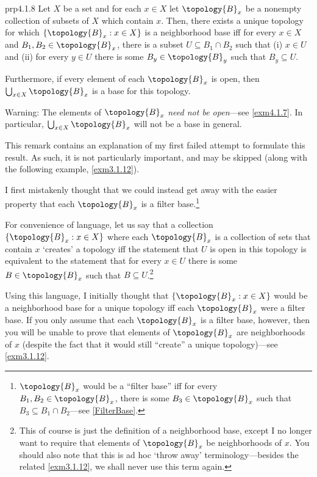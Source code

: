 \begin{prp}{}{prp4.1.8}
Let $X$ be a set and for each $x\in X$ let $\topology{B}_x$ be a nonempty collection of subsets of $X$ which contain $x$.  Then, there exists a unique topology for which $\{ \topology{B}_x:x\in X\}$ is a neighborhood base iff for every $x\in X$ and $B_1,B_2\in \topology{B}_x$, there is a subset $U\subseteq B_1\cap B_2$ such that (i) $x\in U$ and (ii) for every $y\in U$ there is some $B_y\in \topology{B}_y$ such that $B_y\subseteq U$.
	
Furthermore, if every element of each $\topology{B}_x$ is open, then $\bigcup _{x\in X}\topology{B}_x$ is a base for this topology.
\begin{wrn}
Warning:  The elements of $\topology{B}_x$ \emph{need not be open}---see \cref{exm4.1.7}.  In particular, $\bigcup _{x\in X}\topology{B}_x$ will not be a base in general.
\end{wrn}
\begin{rmk}
This remark contains an explanation of my first failed attempt to formulate this result.  As such, it is not particularly important, and may be skipped (along with the following example, \cref{exm3.1.12}).
	
I first mistakenly thought that we could instead get away with the easier property that each $\topology{B}_x$ is a filter base.\footnote{$\topology{B}_x$ would be a ``filter base'' iff for every $B_1,B_2\in \topology{B}_x$, there is some $B_3\in \topology{B}_x$ such that $B_3\subseteq B_1\cap B_2$---see \cref{FilterBase}.}

For convenience of language, let us say that a collection $\{ \topology{B}_x:x\in X\}$ where each $\topology{B}_x$ is a collection of sets that contain $x$ `creates' a topology iff the statement that $U$ is open in this topology is equivalent to the statement that for every $x\in U$ there is some $B\in \topology{B}_x$ such that $B\subseteq U$.\footnote{This of course is just the definition of a neighborhood base, except I no longer want to require that elements of $\topology{B}_x$ be neighborhoods of $x$.  You should also note that this is ad hoc `throw away' terminology---besides the related \cref{exm3.1.12}, we shall never use this term again.}

Using this language, I initially thought that $\{ \topology{B}_x:x\in X \}$ would be a neighborhood base for a unique topology iff each $\topology{B}_x$ were a filter base.  If you only assume that each $\topology{B}_x$ is a filter base, however, then you will be unable to prove that elements of $\topology{B}_x$ are neighborhoods of $x$ (despite the fact that it would still ``create'' a unique topology)---see \cref{exm3.1.12}.


\end{rmk}
\end{prp}
